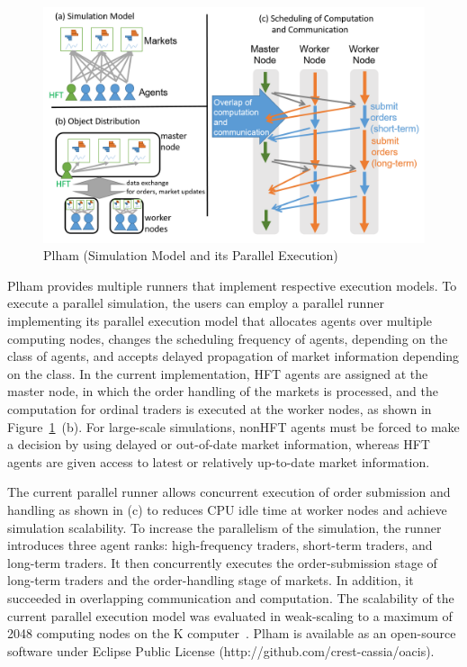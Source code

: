 \begin{figure}[t]
  \centering
  \includegraphics[width=.8\linewidth]{Figs.kamada/plham.png}
  \caption{Plham (Simulation Model and its Parallel Execution)}
  \label{fig:Figs.kamada/plham}
\end{figure}

Plham provides multiple runners that implement respective execution models.
To execute a parallel simulation, the users can employ a parallel runner implementing its parallel execution model that allocates agents over multiple computing nodes,
changes the scheduling frequency of agents, depending on the class of agents, and accepts delayed propagation of market information depending on the class.
In the current implementation, 
HFT agents are assigned at the master node, in which the order handling of the markets is processed,
and the computation for ordinal traders is executed at the worker nodes, as shown in Figure~\ref{fig:Figs.kamada/plham}~(b).
For large-scale simulations, nonHFT agents must be forced to make a decision by using delayed or out-of-date market information, whereas HFT agents are given access to latest or relatively up-to-date market information.

The current parallel runner allows concurrent execution of order submission and handling as shown in (c) to reduces CPU idle time at worker nodes and achieve simulation scalability.
To increase the parallelism of the simulation, the runner introduces three agent ranks: high-frequency traders, short-term traders, and long-term traders.
It then concurrently executes the order-submission stage of long-term traders and the order-handling stage of markets. 
In addition, it succeeded in overlapping communication and computation.
The scalability of the current parallel execution model was evaluated in weak-scaling to a maximum of 2048 computing nodes on the K computer~\cite{arob17plham}.
Plham is available as an open-source software under Eclipse Public License (http://github.com/crest-cassia/oacis).

